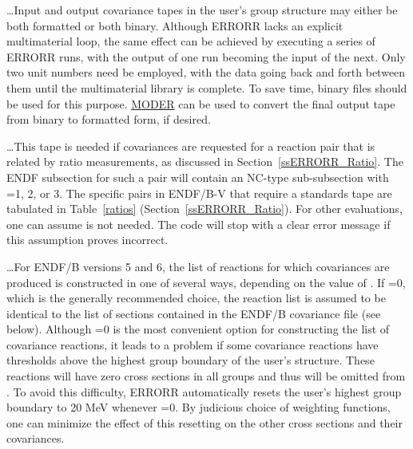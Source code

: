  \ldots\hspace{.1in}Input and output covariance
tapes in the user's group structure may either be both formatted or
both binary.  Although ERRORR lacks an explicit multimaterial
loop, the same effect can be achieved by executing a series of ERRORR
runs, with the output of one run becoming the input of the next.  Only
two unit numbers need be employed, with the data going back and forth
between them until the multimaterial library is complete.  To save
time, binary files should be used for this
purpose.  \hyperlink{sMODERhy}{MODER}
can be used to convert the final output tape from binary to formatted
form, if desired.

 \ldots\hspace{.1in}This tape is needed if covariances
are requested for a reaction pair that is related by ratio
measurements, as discussed in Section~\ref{ssERRORR_Ratio}.  The ENDF
subsection for
such a pair will contain an NC-type sub-subsection with
=1, 2, or 3.  The specific pairs in ENDF/B-V that require
a standards tape are tabulated  in Table~\ref{ratios}
(Section~\ref{ssERRORR_Ratio}).
For other evaluations, one can assume  is not needed.
The code will stop with a clear error message if this assumption
proves incorrect.

 \ldots\hspace{.1in}For ENDF/B versions 5 and 6, the list of
reactions for which covariances are produced is constructed in one of
several ways, depending on the value of .  If
=0, which is the generally recommended choice,
the reaction list is assumed to be identical to the list of sections
contained in the ENDF/B covariance file (see  below).
Although =0 is the most convenient option for constructing
the list of covariance reactions, it leads to a problem if some
covariance reactions have thresholds above the highest group boundary
of the user's structure.  These reactions will have zero cross sections
in all groups and thus will be omitted from .  To avoid
this difficulty, ERRORR automatically resets the user's highest group
boundary to 20 MeV whenever =0.  By judicious choice of
weighting functions, one can minimize the effect of this resetting on
the other cross sections and their covariances.

